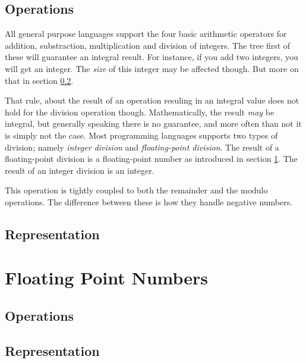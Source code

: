 \subsection{Operations}

All general purpose languages support the four basic arithmetic operators for addition, substraction, multiplication and division of integers. The tree first of these will guarantee an integral result. For instance, if you add two integers, you will get an integer. The \textsl{size} of this integer may be affected though. But more on that in section \ref{primitives:int:representation}.

That rule, about the result of an operation resuling in an integral value does not hold for the division operation though. Mathematically, the result \textsl{may} be integral, but generally speaking there is no guarantee, and more often than not it is simply not the case. Most programming languages supports two types of division; namely \textsl{integer division} and \textsl{floating-point division}. The result of a floating-point division is a floating-point number as introduced in section \ref{primitives:float}. The result of an integer division is an integer.

This operation is tightly coupled to both the remainder and the modulo operations. The difference between these is how they handle negative numbers.


\subsection{Representation}
\label{primitives:int:representation}

\csharpsubsection{\csharp}

\section{Floating Point Numbers}
\label{primitives:float}

\subsection{Operations}
\subsection{Representation}
\csharpsubsection{\csharp}


